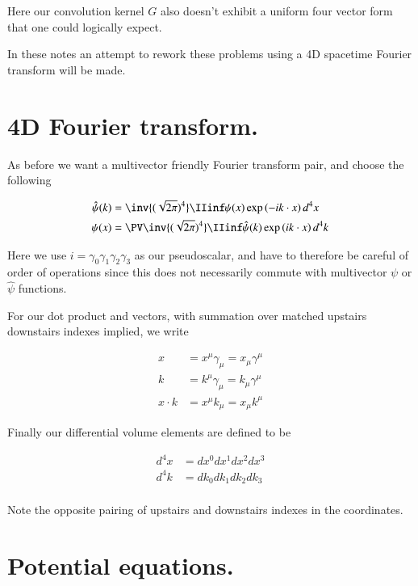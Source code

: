 Here our convolution kernel $G$ also doesn't exhibit a uniform four vector form that one could logically expect.

In these notes an attempt to rework these problems using a 4D spacetime Fourier transform will be made.

\section{4D Fourier transform. }

As before we want a multivector friendly Fourier transform pair, and choose the following

\begin{align}\label{eqn:4d_fourier:FourierTxDefinition}
\hat{\psi}(k) &= \inv{(\sqrt{2\pi})^4} \IIinf \psi(x) \exp\left( -i k \cdot x \right) d^4 x \\
{\psi}(x) &= \PV \inv{(\sqrt{2\pi})^4} \IIinf \hat{\psi}(k) \exp\left( i k \cdot x \right) d^4 k
\end{align}

Here we use $i = \gamma_0 \gamma_1 \gamma_2 \gamma_3$ as our pseudoscalar, and have to therefore be careful of order
of operations since this does not necessarily commute with multivector $\psi$ or $\hat{\psi}$ functions.

For our dot product and vectors, with summation over matched upstairs downstairs indexes implied, we write

\begin{align*}
x &= x^\mu \gamma_\mu = x_\mu \gamma^\mu \\
k &= k^\mu \gamma_\mu = k_\mu \gamma^\mu \\
x \cdot k &= x^\mu k_\mu = x_\mu k^\mu
\end{align*}

Finally our differential volume elements are defined to be

\begin{align*}
d^4 x &= dx^0 dx^1 dx^2 dx^3 \\
d^4 k &= dk_0 dk_1 dk_2 dk_3 \\
\end{align*}

Note the opposite pairing of upstairs and downstairs indexes in the coordinates.

\section{Potential equations. }


